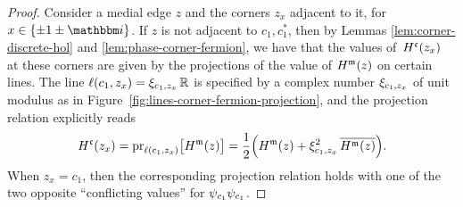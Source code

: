 \documentclass[12pt,oneside,english]{amsart}
\numberwithin{equation}{section}
\numberwithin{figure}{section}
\theoremstyle{plain}
\theoremstyle{plain}
\theoremstyle{plain}
\theoremstyle{plain}
\theoremstyle{remark}
\theoremstyle{definition}
\theoremstyle{plain}
\theoremstyle{plain}
\numberwithin{thm}{section}
\begin{document}
\begin{proof}
Consider a medial edge $z$ and the corners $z_x$ adjacent to it,
for $x \in \set{ \pm 1 \pm \ii } $. If $z$ is not adjacent to $c_1 , c_1^*$, 
then by Lemmas \ref{lem:corner-discrete-hol} and \ref{lem:phase-corner-fermion},
we have that the values of~$H^{\mathfrak{c}} (z_{x})$ at these corners
are given by the projections of the value of $H^{\mathfrak{m}} (z) $ on
certain lines. The line $\ell(c_1, z_x) = \xi_{c_1 , z_x} \, \mathbb{R}$ 
is specified by a complex number $\xi_{c_1 , z_x}$ of unit modulus as in 
Figure~\ref{fig:lines-corner-fermion-projection}, and the projection relation 
explicitly reads
\begin{align}
\label{eq: projection relations for H}
H^{\mathfrak{c}} (z_{x}) = \mathrm{pr}_{\ell(c_1, z_x)} \big[ H^{\mathfrak{m}} (z) 
\big]
 = \frac{1}{2} \Big( H^{\mathfrak{m}} (z)
     + \xi_{c_1 , z_x}^2 \, \overline{H^{\mathfrak{m}} (z)} \Big) . 
\end{align}
When $z_{x} = c_{1}$, %
then the corresponding projection relation holds with one of the two
opposite ``conflicting values'' for ${\psi}_{c_{1}} {\psi}_{c_1}$.


\end{proof}
\end{document}
